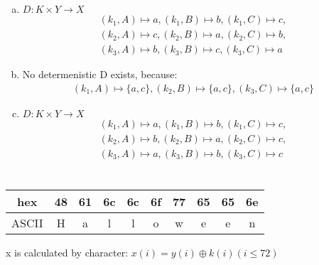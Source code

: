 \documentclass{article}
\begin{document}
	\maketitle
	\section{}
	\begin{enumerate}[a)]
	    \item
			$D: K\times Y\rightarrow X$
			\begin{align*}
				(k_1,A)\mapsto a,
				(k_1,B)\mapsto b,
				(k_1,C)\mapsto c,\\
				(k_2,A)\mapsto c,
				(k_2,B)\mapsto a,
				(k_2,C)\mapsto b,\\
				(k_3,A)\mapsto b,
				(k_3,B)\mapsto c,
				(k_3,C)\mapsto a\,
			\end{align*}
		\item
		    No determenistic D exists, because:
			\begin{align*}
				(k_1, A)\mapsto \{a,c\},
				(k_2, B)\mapsto \{a,c\},
				(k_3, C)\mapsto \{a,c\}
			\end{align*}
		\item
    		$D: K\times Y\rightarrow X$
    		\begin{align*}
    			(k_1,A)\mapsto a,
    			(k_1,B)\mapsto b,
    			(k_1,C)\mapsto c,\\
    			(k_2,A)\mapsto b,
    			(k_2,B)\mapsto a,
    			(k_2,C)\mapsto c,\\
    			(k_3,A)\mapsto a,
    			(k_3,B)\mapsto b,
    			(k_3,C)\mapsto c\,
    		\end{align*}
    \end{enumerate}
    \section{}
    \begin{tabular}{c|ccccccccc}
        hex&48&61&6c&6c&6f&77&65&65&6e\\
        \hline
        ASCII&H&a&l&l&o&w&e&e&n
    \end{tabular}

    x is calculated by character: $x(i)=y(i)\oplus k(i)(i\leq 72)$
\end{document}
